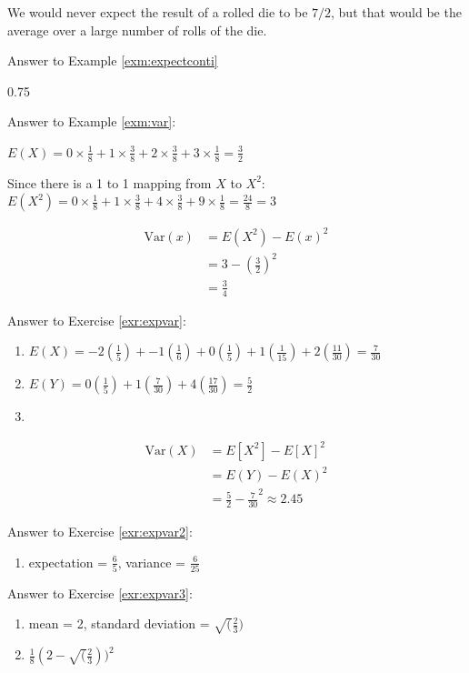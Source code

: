 \documentclass[
]{book}
\providecommand{\tightlist}{%
  \setlength{\itemsep}{0pt}\setlength{\parskip}{0pt}}
\theoremstyle{definition}
\theoremstyle{definition}
\theoremstyle{definition}
\theoremstyle{remark}
\begin{document}
We would never expect the result of a rolled die to be \(7/2\), but that would be the average over a large number of rolls of the die.

Answer to Example \ref{exm:expectconti}

0.75

Answer to Example \ref{exm:var}:

\(E(X) = 0 \times \frac{1}{8} + 1 \times \frac{3}{8} + 2 \times \frac{3}{8} + 3 \times \frac{1}{8} = \frac{3}{2}\)

Since there is a 1 to 1 mapping from \(X\) to \(X^2:\) \(E(X^2) = 0 \times \frac{1}{8} + 1 \times \frac{3}{8} + 4 \times \frac{3}{8} + 9 \times \frac{1}{8} = \frac{24}{8} = 3\)

\begin{align*}
\text{Var}(x) &= E(X^2) - E(x)^2\\
&= 3 - (\frac{3}{2})^2\\
&= \frac{3}{4}
\end{align*}

Answer to Exercise \ref{exr:expvar}:

\begin{enumerate}
\def\labelenumi{\arabic{enumi}.}
\item
  \(E(X) = -2(\frac{1}{5}) + -1(\frac{1}{6}) + 0(\frac{1}{5}) + 1(\frac{1}{15}) + 2(\frac{11}{30}) = \frac{7}{30}\)
\item
  \(E(Y) = 0(\frac{1}{5}) + 1(\frac{7}{30}) + 4(\frac{17}{30}) = \frac{5}{2}\)
\item
\end{enumerate}

\begin{align*}
\text{Var}(X) &= E[X^2] - E[X]^2\\
&= E(Y) - E(X)^2\\
&= \frac{5}{2} - \frac{7}{30}^2 \approx 2.45
\end{align*}

Answer to Exercise \ref{exr:expvar2}:

\begin{enumerate}
\def\labelenumi{\arabic{enumi}.}
\tightlist
\item
  expectation = \(\frac{6}{5}\), variance = \(\frac{6}{25}\)
\end{enumerate}

Answer to Exercise \ref{exr:expvar3}:

\begin{enumerate}
\def\labelenumi{\arabic{enumi}.}
\item
  mean = 2, standard deviation = \(\sqrt(\frac{2}{3})\)
\item
  \(\frac{1}{8}(2 - \sqrt(\frac{2}{3}))^2\)
\end{enumerate}
\end{document}
